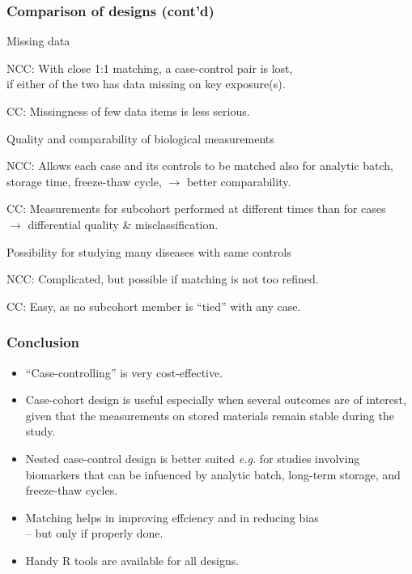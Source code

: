 \documentclass[12pt,dvipsnames,t,handout%
,aspectratio=169%
]{beamer}
\begin{document}
 \begin{frame}
 \frametitle{Comparison of designs (cont'd)}
 \pause
 \bi
 \item Missing data
 \pause
 \bi \item[NCC:]
   With close 1:1 matching, a case-control pair is lost, \\
  if either of the two has data missing on key exposure(s).
  \pause\medskip
  \item[CC:] Missingness of few data items is less serious.
  \ei 
  \pause
 \item Quality and comparability of biological measurements
 \pause
 \bi
 \item[NCC:] Allows 
 each case  and its controls to be matched also 
 for analytic batch, storage time, freeze-thaw cycle,  
    $\to$ better comparability. \pause\medskip
  \item[CC:] Measurements for subcohort 
  performed at different times than for cases \\ 
	$\to$  differential quality \& misclassification.
 \ei
 \pause
 \item  Possibility for studying many diseases with same controls
 \pause
 \bi
 \item[NCC:] Complicated, but possible if matching is not too refined.
 \meskip
 \item[CC:] Easy, as no subcohort member is ``tied'' with any case.
 \ei
 \ei
 
 \end{frame}
 

\begin{frame}
\frametitle{Conclusion}

\pause
\begin{itemize}
\item
``Case-controlling'' is very cost-effective.
\pause
\medskip
\item
 Case-cohort design is useful especially when several outcomes
are of interest, given that the measurements on stored
materials remain stable during the study.
\pause
\medskip
\item
 Nested case-control design is better suited \textit{e.g.}
 for studies involving biomarkers that can be infuenced by analytic batch,
long-term storage, and freeze-thaw cycles.
\pause
\medskip
\item
 Matching helps in improving effciency and in reducing bias \\
-- but only if properly done.
\pause
\medskip
\item
Handy R tools are available for all designs.

\end{itemize}

\end{frame}
\end{document}
